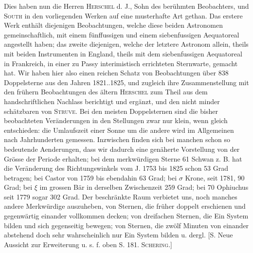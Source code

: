 Dies haben nun die Herren \textsc{Herschel} d. J., Sohn des berühmten Beobachters, und \textsc{South} in den vorliegenden Werken auf eine musterhafte Art gethan. Das erstere Werk enthält diejenigen Beobachtungen, welche diese beiden Astronomen gemeinschaftlich, mit einem fünffussigen und einem siebenfussigen Aequatoreal angestellt haben; das zweite diejenigen, welche der letztere Astronom allein, theils mit beiden Instrumenten in England, theils mit dem siebenfussigen Aequatoreal in Frankreich, in einer zu Passy interimistisch errichteten Sternwarte, gemacht hat. Wir haben hier also einen reichen Schatz von Beobachtungen über 838 Doppelsterne aus den Jahren 1821..1825, und zugleich ihre Zusammenstellung mit den frühern Beobachtungen des ältern \textsc{Herschel} zum Theil aus dem handschriftlichen Nachlass berichtigt und ergänzt, und den nicht minder schätzbaren von \textsc{Struve}. Bei den meisten Doppelsternen sind die bisher beobachteten Veränderungen in den Stellungen zwar nur klein, wenn gleich entschieden: die Umlaufszeit einer Sonne um die andere wird im Allgemeinen nach Jahrhunderten gemessen. Inzwischen finden sich bei manchen schon so bedeutende Aenderungen, dass wir dadurch eine genäherte Vorstellung von der Grösse der Periode erhalten; bei dem merkwürdigen Sterne 61 Schwan z. B. hat die Veränderung des Richtungswinkels vom J. 1753 bis 1825 schon 53 Grad betragen; bei Castor von 1759 bis ebendahin 63 Grad; bei $\sigma$ Krone, seit 1781, 90 Grad; bei $\xi$ im grossen Bär in derselben Zwischenzeit 259 Grad; bei 70 Ophiuchus seit 1779 sogar 302 Grad. Der beschränkte Raum verbietet uns, noch manches andere Merkwürdige auszuheben, von Sternen, die früher doppelt erschienen und gegenwärtig einander vollkommen decken; von dreifachen Sternen, die Ein System bilden und sich gegenseitig bewegen; von Sternen, die zwölf Minuten von einander abstehend doch sehr wahrscheinlich nur Ein System bilden u. dergl. [S. Neue Aussicht zur Erweiterung u. s. f. oben S. 181. \textsc{Schering}.]
